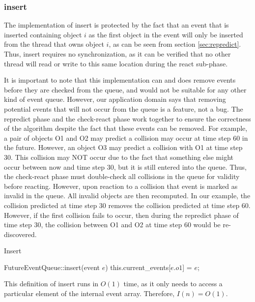 \documentclass[CEJCS,PDF]{cej} %
\begin{document}
\subsubsection{insert}

The implementation of insert is protected by the fact that an event that is inserted containing object $i$ as the first object in the event will only
be inserted from the thread that owns object $i$, as can be seen from section \ref{sec:repredict}.  Thus, insert requires no synchronization, as it can be verified
that no other thread will read or write to this same location during the react sub-phase.  

It is important to note that this implementation can and does remove events before they are checked from the queue,
and would not be suitable for any other kind of event queue.  However, our application domain says that removing potential events that will not occur from the queue is a feature, not a bug.
The repredict phase and the check-react phase work together to ensure the correctness of the algorithm despite the fact that these events can be removed.
For example, a pair of objects O1 and O2 may predict a collision may occur at time step 60 in the future.  However, an object O3 may predict a collision with O1 at time step 30.
This collision may NOT occur due to the fact that something else might occur between now and time step 30, but it is still entered into the queue.  Thus, the check-react phase must double-check
all collisions in the queue for validity before reacting.  However, upon reaction to a collision that event is marked as invalid in the queue.  All invalid
objects are then recomputed.  In our example, the collision predicted at time step 30 removes the collision predicted at time step 60.  However,
if the first collision fails to occur, then during the repredict phase of time step 30, the collision between O1 and O2 at time step 60 would be re-discovered.

\begin{algorithm}
\caption{Insert}
\begin{algorithmic}
\STATE FutureEventQueue::insert(event $e$)
	\STATE this.current\_events[$e.o1$] = $e$;
\ENDIF
\end{algorithmic}
\end{algorithm}

This definition of insert runs in $O(1)$ time, as it only needs to access a particular element of the internal event array.  Therefore, $I(n)=O(1)$.
\end{document}

